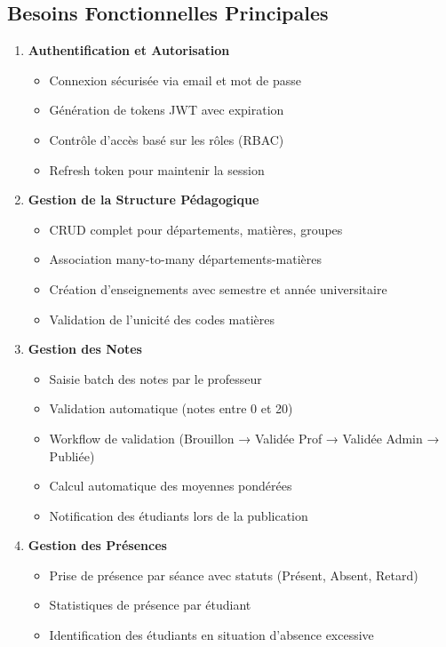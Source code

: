 \documentclass[12pt,a4paper]{report}
\begin{document}
\subsection{Besoins Fonctionnelles Principales}

\begin{enumerate}[itemsep=0.5em]
    \item \textbf{Authentification et Autorisation}
    \begin{itemize}
        \item Connexion sécurisée via email et mot de passe
        \item Génération de tokens JWT avec expiration
        \item Contrôle d'accès basé sur les rôles (RBAC)
        \item Refresh token pour maintenir la session
    \end{itemize}
    
    \item \textbf{Gestion de la Structure Pédagogique}
    \begin{itemize}
        \item CRUD complet pour départements, matières, groupes
        \item Association many-to-many départements-matières
        \item Création d'enseignements avec semestre et année universitaire
        \item Validation de l'unicité des codes matières
    \end{itemize}
    
    \item \textbf{Gestion des Notes}
    \begin{itemize}
        \item Saisie batch des notes par le professeur
        \item Validation automatique (notes entre 0 et 20)
        \item Workflow de validation (Brouillon → Validée Prof → Validée Admin → Publiée)
        \item Calcul automatique des moyennes pondérées
        \item Notification des étudiants lors de la publication
    \end{itemize}
    
    \item \textbf{Gestion des Présences}
    \begin{itemize}
        \item Prise de présence par séance avec statuts (Présent, Absent, Retard)
        \item Statistiques de présence par étudiant
        \item Identification des étudiants en situation d'absence excessive
    \end{itemize}
\end{enumerate}
\end{document}
